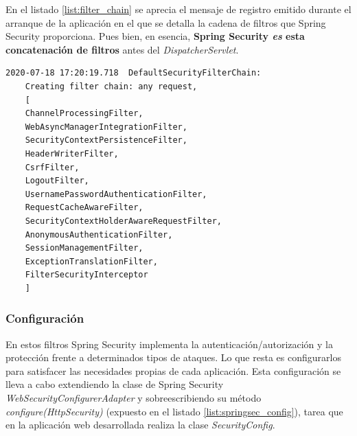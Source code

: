 \documentclass[a4paper]{article}
\begin{document}
	En el listado \ref{list:filter_chain} se aprecia el mensaje de registro emitido durante el arranque de la aplicación en el que se detalla la cadena de filtros que Spring Security proporciona. Pues bien, en esencia, \textbf{Spring Security \emph{es} esta concatenación de filtros} antes del \emph{DispatcherServlet}. 
	\\
	
	\begin{lstlisting}[caption=Cadena de filtros creada por Spring Security, label=list:filter_chain]
	2020-07-18 17:20:19.718  DefaultSecurityFilterChain: 
	Creating filter chain: any request, 
	[
	ChannelProcessingFilter, 
	WebAsyncManagerIntegrationFilter, 
	SecurityContextPersistenceFilter, 
	HeaderWriterFilter, 
	CsrfFilter, 
	LogoutFilter, 
	UsernamePasswordAuthenticationFilter, 
	RequestCacheAwareFilter, 
	SecurityContextHolderAwareRequestFilter, 
	AnonymousAuthenticationFilter, 
	SessionManagementFilter, 
	ExceptionTranslationFilter, 
	FilterSecurityInterceptor
	]
	\end{lstlisting}
	
	\subsubsection{Configuración}
	En estos filtros Spring Security implementa la autenticación/autorización y la protección frente a determinados tipos de ataques. Lo que resta es configurarlos para satisfacer las necesidades propias de cada aplicación. Esta configuración se lleva a cabo extendiendo la clase de Spring Security \emph{WebSecurityConfigurerAdapter} y sobreescribiendo su método \emph{configure(HttpSecurity)} (expuesto en el listado \ref{list:springsec_config}), tarea que en la aplicación web desarrollada realiza la clase \emph{SecurityConfig}.
	\\
	
\end{document}
